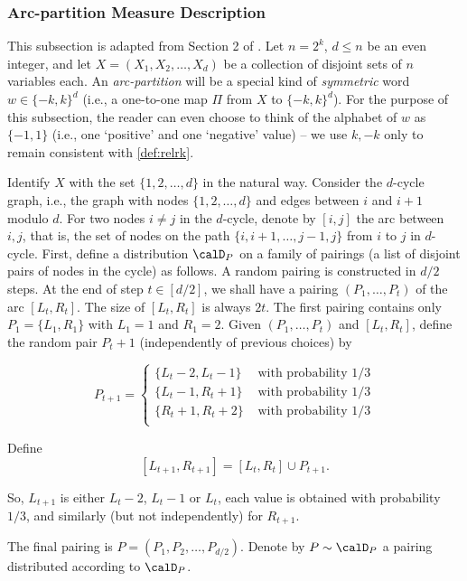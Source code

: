 \documentclass{article}
\begin{document}
\subsubsection{Arc-partition Measure Description}
This subsection is adapted from Section 2 of \cite{DvirMPY12}. Let $n = 2^k$, $d\leq n$ be an even integer, and let $X = (X_1, X_2, \ldots, X_{d})$ be a collection of disjoint sets of $n$ variables each.
An \emph{arc-partition} will be a special kind of \emph{symmetric} word $w\in \{-k,k\}^d$ (i.e., a one-to-one map $\Pi$ from $X$ to $\{-k,k\}^d$). For the purpose of this subsection, the reader can even choose to think of the alphabet of $w$ as $\{-1,1\}$ (i.e., one `positive' and one `negative' value) -- we use $k,-k$ only to remain consistent with \autoref{def:relrk}.

Identify $X$ with the set $\{1, 2,\ldots, d\}$ in the natural way. Consider the $d$-cycle
graph, i.e., the graph with nodes $\{1, 2,\ldots, d\}$ and edges between $i$ and $i + 1$ modulo $d$. For
two nodes $i \neq j$ in the $d$-cycle, denote by $[i, j]$ the arc between $i, j$, that is, the set of nodes on the
path $\{i, i + 1, \ldots , j - 1, j\}$ from $i$ to $j$ in $d$-cycle.
First, define a distribution $\calD_P$ on a family of pairings (a list of disjoint pairs of nodes in the
cycle) as follows. A random pairing is constructed in $d/2$ steps. At the end of step $t \in [d/2]$, we
shall have a pairing $(P_1,\ldots , P_t)$ of the arc $[L_t, R_t]$. The size of $[L_t
, R_t]$ is always $2t$. The first pairing
contains only $P_1 = \{L_1, R_1\}$ with $L_1 = 1$ and $R_1 = 2$. Given $(P_1, \ldots, P_t)$ and $[L_t, R_t]$, define the
random pair $P_t+1$ (independently of previous choices) by 

$$
P_{t+1} = \begin{cases}
    \{L_t - 2, L_t - 1\} &\text{ with probability $1/3$}\\
    \{L_t - 1, R_t + 1\} &\text{ with probability $1/3$}\\
    \{R_t + 1, R_t + 2\} &\text{ with probability $1/3$}\\
\end{cases}
$$

Define
$$
[L_{t+1},R_{t+1}] = [L_t,R_t] \cup P_{t+1}.
$$

So, $L_{t+1}$ is either $L_t - 2$, $L_t - 1$ or $L_t$, each value is obtained with probability $1/3$, and similarly
(but not independently) for $R_{t+1}$.

The final pairing is
$P = (P_1, P_2, \ldots , P_{d/2}
)$.
Denote by $P \sim \calD_P$ a pairing distributed according to $\calD_P$.
\end{document}
